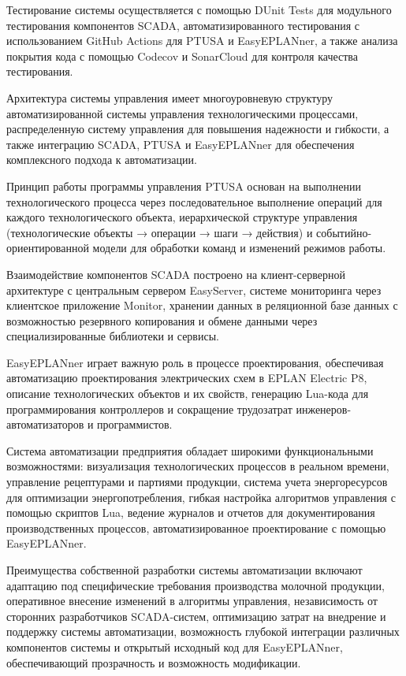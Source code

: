 {  \par \redline Тестирование системы осуществляется с помощью DUnit Tests для модульного тестирования компонентов SCADA, автоматизированного тестирования с использованием GitHub Actions для PTUSA и EasyEPLANner, а также анализа покрытия кода с помощью Codecov и SonarCloud для контроля качества тестирования.

  \par \redline Архитектура системы управления имеет многоуровневую структуру автоматизированной системы управления технологическими процессами, распределенную систему управления для повышения надежности и гибкости, а также интеграцию SCADA, PTUSA и EasyEPLANner для обеспечения комплексного подхода к автоматизации.

  \par \redline Принцип работы программы управления PTUSA основан на выполнении технологического процесса через последовательное выполнение операций для каждого технологического объекта, иерархической структуре управления (технологические объекты → операции → шаги → действия) и событийно-ориентированной модели для обработки команд и изменений режимов работы.

  \par \redline Взаимодействие компонентов SCADA построено на клиент-серверной архитектуре с центральным сервером EasyServer, системе мониторинга через клиентское приложение Monitor, хранении данных в реляционной базе данных с возможностью резервного копирования и обмене данными через специализированные библиотеки и сервисы.

  \par \redline EasyEPLANner играет важную роль в процессе проектирования, обеспечивая автоматизацию проектирования электрических схем в EPLAN Electric P8, описание технологических объектов и их свойств, генерацию Lua-кода для программирования контроллеров и сокращение трудозатрат инженеров-автоматизаторов и программистов.

  \par \redline Система автоматизации предприятия обладает широкими функциональными возможностями: визуализация технологических процессов в реальном времени, управление рецептурами и партиями продукции, система учета энергоресурсов для оптимизации энергопотребления, гибкая настройка алгоритмов управления с помощью скриптов Lua, ведение журналов и отчетов для документирования производственных процессов, автоматизированное проектирование с помощью EasyEPLANner.

  \par \redline Преимущества собственной разработки системы автоматизации включают адаптацию под специфические требования производства молочной продукции, оперативное внесение изменений в алгоритмы управления, независимость от сторонних разработчиков SCADA-систем, оптимизацию затрат на внедрение и поддержку системы автоматизации, возможность глубокой интеграции различных компонентов системы и открытый исходный код для EasyEPLANner, обеспечивающий прозрачность и возможность модификации.

}
